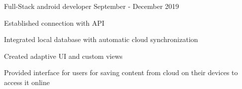 

\vspace{0cm}\begin{cventries}




				\cventry
				{Full-Stack android developer}
				{}
				{}
				{September - December 2019}
				{
					\begin{cvitems}
						\item {Established connection with API}
						\item {Integrated local database with automatic cloud synchronization}
						\item {Created adaptive UI and custom views}
						\item {Provided interface for users for saving content from cloud on their devices to access it online}
					\end{cvitems}
				}


\end{cventries}